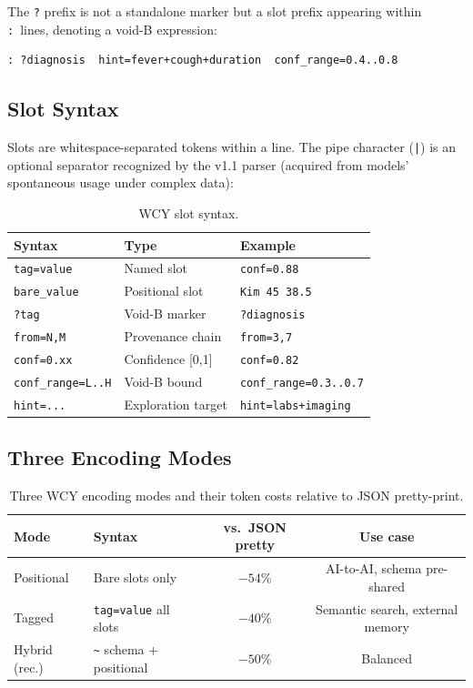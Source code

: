 \documentclass[11pt,a4paper]{article}
\begin{document}
The \texttt{?} prefix is not a standalone marker but a slot prefix appearing within \texttt{:}~lines, denoting a void-B expression:

\begin{lstlisting}
: ?diagnosis  hint=fever+cough+duration  conf_range=0.4..0.8
\end{lstlisting}

\subsection{Slot Syntax}

Slots are whitespace-separated tokens within a line. The pipe character (\texttt{|}) is an optional separator recognized by the v1.1 parser (acquired from models' spontaneous usage under complex data):

\begin{table}[H]
\centering
\small
\begin{tabular}{@{}lll@{}}
\toprule
\textbf{Syntax} & \textbf{Type} & \textbf{Example} \\
\midrule
\texttt{tag=value}      & Named slot          & \texttt{conf=0.88} \\
\texttt{bare\_value}    & Positional slot     & \texttt{Kim 45 38.5} \\
\texttt{?tag}           & Void-B marker       & \texttt{?diagnosis} \\
\texttt{from=N,M}       & Provenance chain    & \texttt{from=3,7} \\
\texttt{conf=0.xx}      & Confidence [0,1]    & \texttt{conf=0.82} \\
\texttt{conf\_range=L..H} & Void-B bound      & \texttt{conf\_range=0.3..0.7} \\
\texttt{hint=...}       & Exploration target  & \texttt{hint=labs+imaging} \\
\bottomrule
\end{tabular}
\caption{WCY slot syntax.}
\label{tab:slots}
\end{table}

\subsection{Three Encoding Modes}

\begin{table}[H]
\centering
\small
\begin{tabular}{@{}llcc@{}}
\toprule
\textbf{Mode} & \textbf{Syntax} & \textbf{vs.\ JSON pretty} & \textbf{Use case} \\
\midrule
Positional & Bare slots only  & $-54\%$ & AI-to-AI, schema pre-shared \\
Tagged     & \texttt{tag=value} all slots & $-40\%$ & Semantic search, external memory \\
Hybrid (rec.) & \texttt{\textasciitilde} schema + positional & $-50\%$ & Balanced \\
\bottomrule
\end{tabular}
\caption{Three WCY encoding modes and their token costs relative to JSON pretty-print.}
\label{tab:modes}
\end{table}
\end{document}
